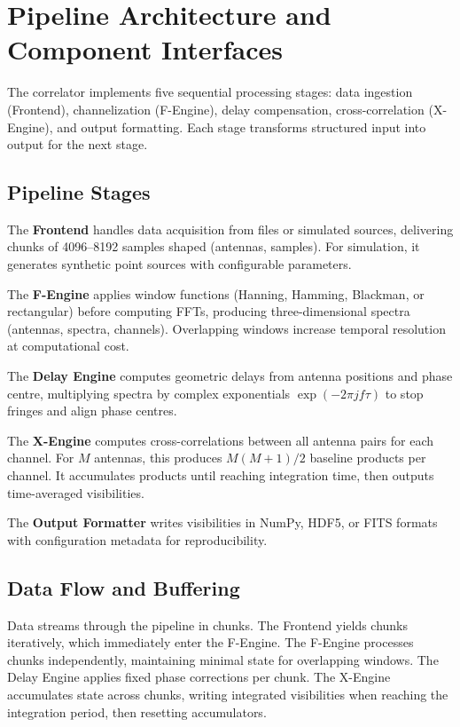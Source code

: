 \section{Pipeline Architecture and Component Interfaces}

The correlator implements five sequential processing stages: data ingestion (Frontend), channelization (F-Engine), delay compensation, cross-correlation (X-Engine), and output formatting. Each stage transforms structured input into output for the next stage.

\subsection{Pipeline Stages}

The \textbf{Frontend} handles data acquisition from files or simulated sources, delivering chunks of 4096–8192 samples shaped (antennas, samples). For simulation, it generates synthetic point sources with configurable parameters.

The \textbf{F-Engine} applies window functions (Hanning, Hamming, Blackman, or rectangular) before computing FFTs, producing three-dimensional spectra (antennas, spectra, channels). Overlapping windows increase temporal resolution at computational cost.

The \textbf{Delay Engine} computes geometric delays from antenna positions and phase centre, multiplying spectra by complex exponentials $\exp(-2\pi j f \tau)$ to stop fringes and align phase centres.

The \textbf{X-Engine} computes cross-correlations between all antenna pairs for each channel. For $M$ antennas, this produces $M(M+1)/2$ baseline products per channel. It accumulates products until reaching integration time, then outputs time-averaged visibilities.

The \textbf{Output Formatter} writes visibilities in NumPy, HDF5, or FITS formats with configuration metadata for reproducibility.

\subsection{Data Flow and Buffering}

Data streams through the pipeline in chunks. The Frontend yields chunks iteratively, which immediately enter the F-Engine. The F-Engine processes chunks independently, maintaining minimal state for overlapping windows. The Delay Engine applies fixed phase corrections per chunk. The X-Engine accumulates state across chunks, writing integrated visibilities when reaching the integration period, then resetting accumulators.

